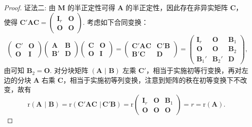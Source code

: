 \documentclass[../../main.tex]{subfiles}
\begin{document}
\begin{proof}
{\color{blue}证法二:}
由 $\boldsymbol{M}$ 的半正定性可得 $\boldsymbol{A}$ 的半正定性，因此存在非异实矩阵 $\boldsymbol{C}$，使得 $\boldsymbol{C}'\boldsymbol{A}\boldsymbol{C}=\begin{pmatrix}
\boldsymbol{I}_r & \boldsymbol{O} \\
\boldsymbol{O} & \boldsymbol{O}
\end{pmatrix}$. 考虑如下合同变换：
\begin{align*}
\begin{pmatrix}
\boldsymbol{C}' & \boldsymbol{O} \\
\boldsymbol{O} & \boldsymbol{I}
\end{pmatrix}
\begin{pmatrix}
\boldsymbol{A} & \boldsymbol{B} \\
\boldsymbol{B}' & \boldsymbol{D}
\end{pmatrix}
\begin{pmatrix}
\boldsymbol{C} & \boldsymbol{O} \\
\boldsymbol{O} & \boldsymbol{I}
\end{pmatrix}=
\begin{pmatrix}
\boldsymbol{C}'\boldsymbol{A}\boldsymbol{C} & \boldsymbol{C}'\boldsymbol{B} \\
\boldsymbol{B}'\boldsymbol{C} & \boldsymbol{D}
\end{pmatrix}=
\begin{pmatrix}
\boldsymbol{I}_r & \boldsymbol{O} & \boldsymbol{B}_1 \\
\boldsymbol{O} & \boldsymbol{O} & \boldsymbol{B}_2 \\
\boldsymbol{B}_1' & \boldsymbol{B}_2' & \boldsymbol{D}
\end{pmatrix},
\end{align*}
由可知 $\boldsymbol{B}_2 = \boldsymbol{O}$. 对分块矩阵 $\left( \boldsymbol{A}\,\,|\,\,\boldsymbol{B} \right)$ 左乘 $\boldsymbol{C}'$，相当于实施初等行变换，再对左边的分块 $\boldsymbol{A}$ 右乘 $\boldsymbol{C}$，相当于实施初等列变换，注意到矩阵的秩在初等变换下不改变，故有
\[
\mathrm{r}\left( \boldsymbol{A}\,\,|\,\,\boldsymbol{B} \right) =\mathrm{r}\left( \boldsymbol{C}' \boldsymbol{AC}\,\,|\,\boldsymbol{C}' \boldsymbol{B} \right) =\mathrm{r}\begin{pmatrix}
\boldsymbol{I}_r & \boldsymbol{O} & \boldsymbol{B}_1 \\
\boldsymbol{O} & \boldsymbol{O} & \boldsymbol{O}
\end{pmatrix}=r = \mathrm{r}(\boldsymbol{A}).\]
\end{proof}
\end{document}
